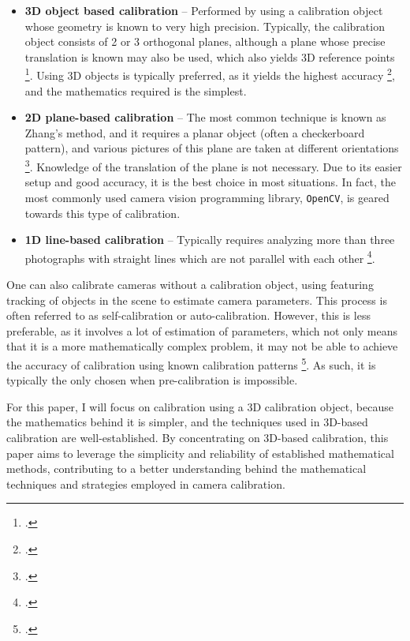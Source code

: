 \begin{itemize}[leftmargin=!, itemindent=-4ex]
    \item \textbf{3D object based calibration} -- Performed by using a calibration object whose geometry is known to very high precision. Typically, the calibration object consists of 2 or 3 orthogonal planes, although a plane whose precise translation is known may also be used, which also yields 3D reference points \footcite{zhangCameraCalibration2007}. Using 3D objects is typically preferred, as it yields the highest accuracy \footcite{zhangCameraCalibration2007}, and the mathematics required is the simplest.
    \item \textbf{2D plane-based calibration} -- The most common technique is known as Zhang's method, and it requires a planar object (often a checkerboard pattern), and various pictures of this plane are taken at different orientations \footcite{zhangFlexibleNew2000}. Knowledge of the translation of the plane is not necessary. Due to its easier setup and good accuracy, it is the best choice in most situations. In fact, the most commonly used camera vision programming library, \texttt{OpenCV}, is geared towards this type of calibration. 
    \item \textbf{1D line-based calibration} -- Typically requires analyzing more than three photographs with straight lines which are not parallel with each other \footcite{chuLineBasedCamera2005}. 
\end{itemize}

One can also calibrate cameras without a calibration object, using featuring tracking of objects in the scene to estimate camera parameters. This process is often referred to as self-calibration or auto-calibration. However, this is less preferable, as it involves a lot of estimation of parameters, which not only means that it is a more mathematically complex problem, it may not be able to achieve the accuracy of calibration using known calibration patterns \footcite{zhangCameraCalibration2007}. As such, it is typically the only chosen when pre-calibration is impossible. 

For this paper, I will focus on calibration using a 3D calibration object, because the mathematics behind it is simpler, and the techniques used in 3D-based calibration are well-established. By concentrating on 3D-based calibration, this paper aims to leverage the simplicity and reliability of established mathematical methods, contributing to a better understanding behind the mathematical techniques and strategies employed in camera calibration.
